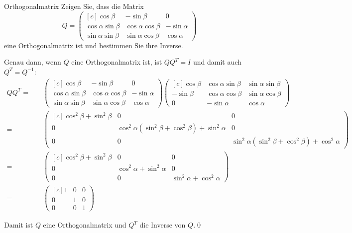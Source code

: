 \documentclass[german]{../spicker}
\newcommand{\vektor}[1]{\begin{pmatrix*}[c] #1 \end{pmatrix*}}
\begin{document}
\begin{example}{Orthogonalmatrix}
    Zeigen Sie, dass die Matrix
    $$
        Q = \vektor{
            \cos \beta & -\sin\beta & 0 \\
            \cos \alpha \sin\beta & \cos\alpha \cos\beta & -\sin\alpha \\
            \sin\alpha \sin\beta & \sin\alpha \cos\beta & \cos\alpha
        }
    $$
    eine Orthogonalmatrix ist und bestimmen Sie ihre Inverse.

    \exampleseparator

    Genau dann, wenn $Q$ eine Orthogonalmatrix ist, ist $QQ^T = I$ und damit auch $Q^T = Q^{-1}$:
    $$
        \begin{aligned}
            QQ^T = \quad        &
            \vektor{ \cos \beta & -\sin\beta                        & 0                        \\ \cos \alpha \sin\beta & \cos\alpha \cos\beta & -\sin\alpha \\ \sin\alpha \sin\beta & \sin\alpha \cos\beta & \cos\alpha }
            \vektor{ \cos\beta  & \cos\alpha \sin\beta              & \sin\alpha \sin\beta     \\ -\sin\beta & \cos\alpha \cos\beta & \sin\alpha \cos\beta \\ 0 & -\sin\alpha & \cos\alpha} \\
            = \quad             & \vektor{\cos^2\beta + \sin^2\beta & 0                    & 0 \\ 0 & \cos^2\alpha \left( \sin^2\beta + \cos^2\beta \right) + \sin^2\alpha & 0  \\ 0 & 0 & \sin^2\alpha \left( \sin^2\beta + \cos^2\beta \right) + \cos^2\alpha} \\
            = \quad             & \vektor{\cos^2\beta + \sin^2\beta & 0                    & 0 \\ 0 & \cos^2\alpha  + \sin^2\alpha & 0  \\ 0 & 0 & \sin^2\alpha + \cos^2\alpha} \\
            = \quad             & \vektor{1                         & 0                    & 0 \\ 0 & 1 & 0  \\ 0 & 0 & 1}
        \end{aligned}
    $$

    Damit ist $Q$ eine Orthogonalmatrix und $Q^T$ die Inverse von $Q$.\qed
\end{example}
\end{document}

